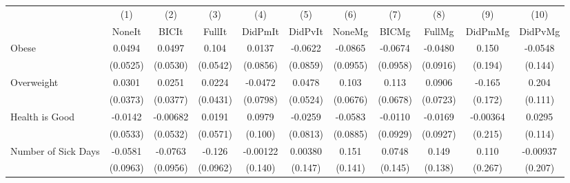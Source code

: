 {
\def\sym#1{\ifmmode^{#1}\else\(^{#1}\)\fi}
\begin{tabular}{l*{10}{c}}
\toprule
            &\multicolumn{1}{c}{(1)}&\multicolumn{1}{c}{(2)}&\multicolumn{1}{c}{(3)}&\multicolumn{1}{c}{(4)}&\multicolumn{1}{c}{(5)}&\multicolumn{1}{c}{(6)}&\multicolumn{1}{c}{(7)}&\multicolumn{1}{c}{(8)}&\multicolumn{1}{c}{(9)}&\multicolumn{1}{c}{(10)}\\
            &\multicolumn{1}{c}{NoneIt}&\multicolumn{1}{c}{BICIt}&\multicolumn{1}{c}{FullIt}&\multicolumn{1}{c}{DidPmIt}&\multicolumn{1}{c}{DidPvIt}&\multicolumn{1}{c}{NoneMg}&\multicolumn{1}{c}{BICMg}&\multicolumn{1}{c}{FullMg}&\multicolumn{1}{c}{DidPmMg}&\multicolumn{1}{c}{DidPvMg}\\
\midrule
Obese       &      0.0494         &      0.0497         &       0.104         &      0.0137         &     -0.0622         &     -0.0865         &     -0.0674         &     -0.0480         &       0.150         &     -0.0548         \\
            &    (0.0525)         &    (0.0530)         &    (0.0542)         &    (0.0856)         &    (0.0859)         &    (0.0955)         &    (0.0958)         &    (0.0916)         &     (0.194)         &     (0.144)         \\
\addlinespace
Overweight  &      0.0301         &      0.0251         &      0.0224         &     -0.0472         &      0.0478         &       0.103         &       0.113         &      0.0906         &      -0.165         &       0.204         \\
            &    (0.0373)         &    (0.0377)         &    (0.0431)         &    (0.0798)         &    (0.0524)         &    (0.0676)         &    (0.0678)         &    (0.0723)         &     (0.172)         &     (0.111)         \\
\addlinespace
Health is Good&     -0.0142         &    -0.00682         &      0.0191         &      0.0979         &     -0.0259         &     -0.0583         &     -0.0110         &     -0.0169         &    -0.00364         &      0.0295         \\
            &    (0.0533)         &    (0.0532)         &    (0.0571)         &     (0.100)         &    (0.0813)         &    (0.0885)         &    (0.0929)         &    (0.0927)         &     (0.215)         &     (0.114)         \\
\addlinespace
Number of Sick Days&     -0.0581         &     -0.0763         &      -0.126         &    -0.00122         &     0.00380         &       0.151         &      0.0748         &       0.149         &       0.110         &    -0.00937         \\
            &    (0.0963)         &    (0.0956)         &    (0.0962)         &     (0.140)         &     (0.147)         &     (0.141)         &     (0.145)         &     (0.138)         &     (0.267)         &     (0.207)         \\
\bottomrule
\end{tabular}
}
